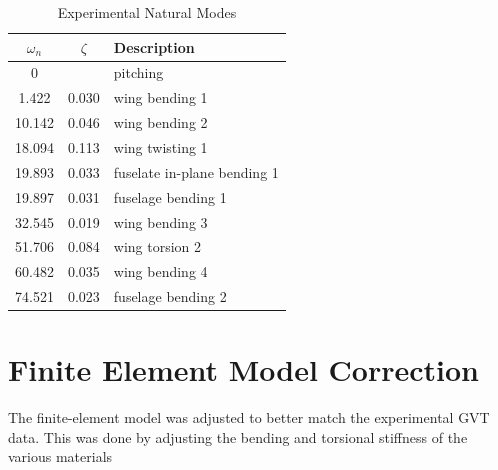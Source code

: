 \begin{table}[H]
    \centering
    \caption{Experimental Natural Modes}
    \begin{tabular}{ccl}
        \hline\hline
        $\omega_n$ & $\zeta$ & Description \\
        \hline
        0      &       & pitching \\
        1.422  & 0.030 & wing bending 1 \\
        10.142 & 0.046 & wing bending 2 \\
        18.094 & 0.113 & wing twisting 1 \\
        19.893 & 0.033 & fuselate in-plane bending 1 \\
        19.897 & 0.031 & fuselage bending 1 \\
        32.545 & 0.019 & wing bending 3 \\
        51.706 & 0.084 & wing torsion 2 \\
        60.482 & 0.035 & wing bending 4 \\
        74.521 & 0.023 & fuselage bending 2 \\
        \hline\hline
    \end{tabular}
    \label{tab:expModalData}
\end{table}

\section{Finite Element Model Correction} %

The finite-element model was adjusted to better match the experimental GVT data. This was done by adjusting the bending and torsional stiffness of the various materials